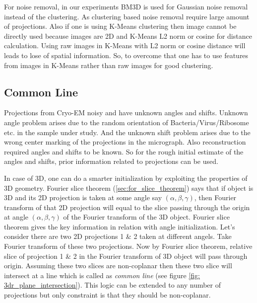 \documentclass{report}
\begin{document}
For noise removal, in our experiments BM3D is used for Gaussian noise removal instead of the clustering. As clustering based noise removal require large amount of projections. Also if one is using K-Means clustering then image cannot be directly used because images are 2D and K-Means L2 norm or cosine for distance calculation. Using raw images in K-Means with L2 norm or cosine distance will leads to lose of spatial information.  So, to overcome that one has to use features from images in K-Means rather than raw images for good clustering.

\subsection{Common Line}

Projections from Cryo-EM noisy and have unknown angles and shifts. Unknown angle problem arises due to the random orientation of Bacteria/Virus/Ribosome etc. in the sample under study. And the unknown shift problem arises due to the wrong center marking of the projections in the micrograph. Also reconstruction required angles and shifts to be known. So for the rough initial estimate of the angles and shifts, prior information related to projections can be used. 

In case of 3D, one can do a smarter initialization by exploiting the properties of 3D geometry. Fourier slice theorem (\ref{sec:for_slice_theorem}) says that if object is 3D and its 2D projection is taken at some angle say $(\alpha,\beta,\gamma)$, then Fourier transform of that 2D projection will equal to the slice passing through the origin  at angle $(\alpha,\beta,\gamma)$ of the Fourier transform of the 3D object. Fourier slice theorem gives the key information in relation with angle initialization. Let's consider there are two 2D projections 1 \& 2 taken at different angels. Take Fourier transform of these two projections. Now by Fourier slice theorem, relative slice of projection 1 \& 2 in the Fourier transform of 3D object will pass through origin. Assuming these two slices are non-coplanar then these two slice will intersect at a line which is called as \textit{common line} \cite{mallick2006structure} \cite{van1987angular} (see figure \ref{fig: 3dr_plane_intersection}). This logic can be extended to any number of projections but only constraint is that they should be non-coplanar. \\
\end{document}
